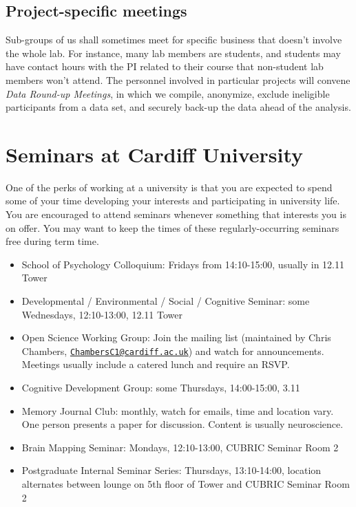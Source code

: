 \documentclass[12pt,]{book}
\providecommand{\tightlist}{%
  \setlength{\itemsep}{0pt}\setlength{\parskip}{0pt}}
\theoremstyle{definition}
\theoremstyle{definition}
\theoremstyle{definition}
\theoremstyle{remark}
\begin{document}
\section{Project-specific meetings}\label{project-specific-meetings}

Sub-groups of us shall sometimes meet for specific business that doesn't
involve the whole lab. For instance, many lab members are students, and
students may have contact hours with the PI related to their course that
non-student lab members won't attend. The personnel involved in
particular projects will convene \emph{Data Round-up Meetings}, in which
we compile, anonymize, exclude ineligible participants from a data set,
and securely back-up the data ahead of the analysis.

\chapter{Seminars at Cardiff
University}\label{seminars-at-cardiff-university}

One of the perks of working at a university is that you are expected to
spend some of your time developing your interests and participating in
university life. You are encouraged to attend seminars whenever
something that interests you is on offer. You may want to keep the times
of these regularly-occurring seminars free during term time.

\begin{itemize}
\tightlist
\item
  School of Psychology Colloquium: Fridays from 14:10-15:00, usually in
  12.11 Tower
\item
  Developmental / Environmental / Social / Cognitive Seminar: some
  Wednesdays, 12:10-13:00, 12.11 Tower
\item
  Open Science Working Group: Join the mailing list (maintained by Chris
  Chambers,
  \href{mailto:ChambersC1@cardiff.ac.uk}{\nolinkurl{ChambersC1@cardiff.ac.uk}})
  and watch for announcements. Meetings usually include a catered lunch
  and require an RSVP.
\item
  Cognitive Development Group: some Thursdays, 14:00-15:00, 3.11
\item
  Memory Journal Club: monthly, watch for emails, time and location
  vary. One person presents a paper for discussion. Content is usually
  neuroscience.
\item
  Brain Mapping Seminar: Mondays, 12:10-13:00, CUBRIC Seminar Room 2
\item
  Postgraduate Internal Seminar Series: Thursdays, 13:10-14:00, location
  alternates between lounge on 5th floor of Tower and CUBRIC Seminar
  Room 2
\end{itemize}
\end{document}
